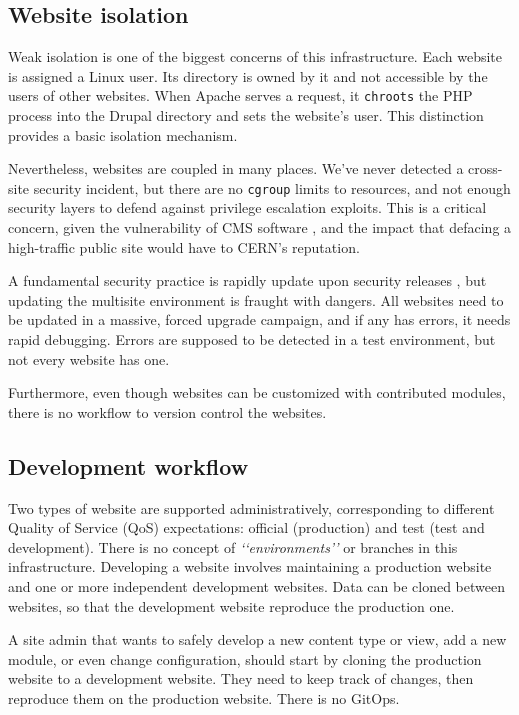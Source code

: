 \subsection{Website isolation}

Weak isolation is one of the biggest concerns of this infrastructure.
Each website is assigned a Linux user.
Its directory is owned by it and not accessible by the users of other websites.
When Apache serves a request, it \texttt{chroots} the PHP process into the Drupal directory and sets the website's user.
This distinction provides a basic isolation mechanism.

Nevertheless, websites are coupled in many places.
We've never detected a cross-site security incident,
but there are no \texttt{cgroup} limits to resources, and not enough security layers to defend against privilege escalation exploits.
This is a critical concern, given the vulnerability of CMS software \cite{shteimanWhyCMSPlatforms2014},
and the impact that defacing a high-traffic public site would have to CERN's reputation.

A fundamental security practice is rapidly update upon security releases \cite{csontosAccessibilityUsabilitySecurity2021},
but updating the multisite environment is fraught with dangers.
All websites need to be updated in a massive, forced upgrade campaign, and if any has errors, it needs rapid debugging.
Errors are supposed to be detected in a test environment, but not every website has one.

Furthermore, even though websites can be customized with contributed modules, there is no workflow to version control the websites.

\subsection{Development workflow}

Two types of website are supported administratively, corresponding to different Quality of Service (QoS) expectations: official (production) and test (test and development).
There is no concept of \emph{\lq\lq environments\rq\rq} or branches in this infrastructure. Developing a website involves maintaining a production website and one or more independent development websites.
Data can be cloned between websites, so that the development website reproduce the production one.

A site admin that wants to safely develop a new content type or view, add a new module, or even change configuration, should start by cloning the production website to a development website.
They need to keep track of changes, then reproduce them on the production website.
There is no GitOps.

